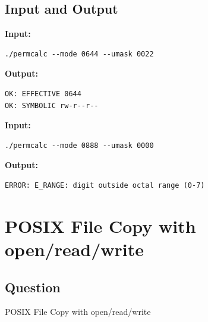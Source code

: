 \documentclass[12pt,a4paper]{article}
\begin{document}
\subsection{Input and Output}

\noindent\textbf{Input:}
\begin{verbatim}
./permcalc --mode 0644 --umask 0022
\end{verbatim}

\vspace{0.5cm}

\noindent\textbf{Output:}
\begin{verbatim}
OK: EFFECTIVE 0644
OK: SYMBOLIC rw-r--r--
\end{verbatim}

\vspace{1cm}

\noindent\textbf{Input:}
\begin{verbatim}
./permcalc --mode 0888 --umask 0000
\end{verbatim}

\vspace{0.5cm}

\noindent\textbf{Output:}
\begin{verbatim}
ERROR: E_RANGE: digit outside octal range (0-7)
\end{verbatim}
\newpage

\section{POSIX File Copy with open/read/write}
\subsection{Question}
POSIX File Copy with open/read/write
\end{document}
